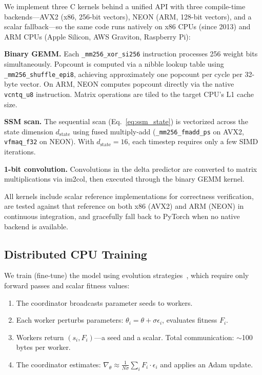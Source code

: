 \documentclass[11pt]{article}
\begin{document}
We implement three C kernels behind a unified API with three compile-time backends---AVX2 (x86, 256-bit vectors), NEON (ARM, 128-bit vectors), and a scalar fallback---so the same code runs natively on x86 CPUs (since 2013) and ARM CPUs (Apple Silicon, AWS Graviton, Raspberry Pi):

\textbf{Binary GEMM.} Each \texttt{\_mm256\_xor\_si256} instruction processes 256 weight bits simultaneously. Popcount is computed via a nibble lookup table using \texttt{\_mm256\_shuffle\_epi8}, achieving approximately one popcount per cycle per 32-byte vector. On ARM, NEON computes popcount directly via the native \texttt{vcntq\_u8} instruction. Matrix operations are tiled to the target CPU's L1 cache size.

\textbf{SSM scan.} The sequential scan (Eq.~\ref{eq:ssm_state}) is vectorized across the state dimension $d_{\text{state}}$ using fused multiply-add (\texttt{\_mm256\_fmadd\_ps} on AVX2, \texttt{vfmaq\_f32} on NEON). With $d_{\text{state}}=16$, each timestep requires only a few SIMD iterations.

\textbf{1-bit convolution.} Convolutions in the delta predictor are converted to matrix multiplications via im2col, then executed through the binary GEMM kernel.

All kernels include scalar reference implementations for correctness verification, are tested against that reference on both x86 (AVX2) and ARM (NEON) in continuous integration, and gracefully fall back to PyTorch when no native backend is available.

\subsection{Distributed CPU Training}
\label{sec:distributed}

We train (fine-tune) the model using evolution strategies~\citep{salimans2017evolution}, which require only forward passes and scalar fitness values:

\begin{enumerate}[leftmargin=2em, itemsep=0.1em]
  \item The coordinator broadcasts parameter seeds to workers.
  \item Each worker perturbs parameters: $\theta_i = \theta + \sigma \epsilon_i$, evaluates fitness $F_i$.
  \item Workers return $(s_i, F_i)$---a seed and a scalar. Total communication: $\sim$100 bytes per worker.
  \item The coordinator estimates: $\nabla_\theta \approx \frac{1}{N\sigma}\sum_i F_i \cdot \epsilon_i$ and applies an Adam update.
\end{enumerate}
\end{document}
